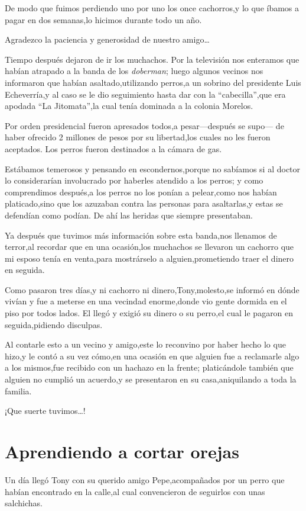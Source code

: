 \documentclass[letterpaper,12pt]{book}
\begin{document}
De modo que fuimos perdiendo uno por uno los once cachorros,y lo que íbamos a pagar en dos semanas,lo hicimos durante todo un año.

Agradezco la paciencia y generosidad de nuestro amigo\ldots

Tiempo después dejaron de ir los muchachos. Por la televisión nos enteramos que habían atrapado a la banda de los {\it doberman}\/; luego algunos vecinos nos informaron que habían asaltado,utilizando perros,a un sobrino del presidente Luis Echeverría,y al caso se le dio seguimiento hasta dar con la ``cabecilla'',que era apodada ``La Jitomata'',la cual tenía dominada a la colonia Morelos. 

Por orden presidencial fueron apresados todos,a pesar---después se supo--- de haber ofrecido 2 millones de pesos por su libertad,los cuales no les fueron aceptados. Los perros fueron destinados a la cámara de gas.

Estábamos temerosos y pensando en escondernos,porque no sabíamos si al doctor lo considerarían involucrado por haberles atendido a los perros; y como comprendimos después,a los perros no los ponían a pelear,como nos habían platicado,sino que los azuzaban contra las personas para asaltarlas,y estas se defendían como podían. De ahí las heridas que siempre presentaban.

Ya después que tuvimos más información sobre esta banda,nos llenamos de terror,al recordar que en una ocasión,los muchachos se llevaron un cachorro que mi esposo tenía en venta,para mostrárselo a alguien,prometiendo traer el dinero en seguida.

Como pasaron tres días,y ni cachorro ni dinero,Tony,molesto,se informó en dónde vivían y fue a meterse en una vecindad enorme,donde vio gente dormida en el piso por todos lados.  El llegó y exigió su dinero o su perro,el cual le pagaron en seguida,pidiendo disculpas.

Al contarle esto a un vecino y amigo,este lo reconvino por haber hecho lo que hizo,y le contó a su vez cómo,en una ocasión en que alguien fue a reclamarle algo a los mismos,fue recibido con un hachazo en la frente; platicándole también que alguien no cumplió un acuerdo,y se presentaron en su casa,aniquilando a toda la familia.

¡Que suerte tuvimos\ldots!
\chapter{Aprendiendo a cortar orejas}
Un día llegó Tony con su querido amigo Pepe,acompañados por un perro que habían encontrado en la calle,al cual convencieron de seguirlos con unas salchichas.
\end{document}
